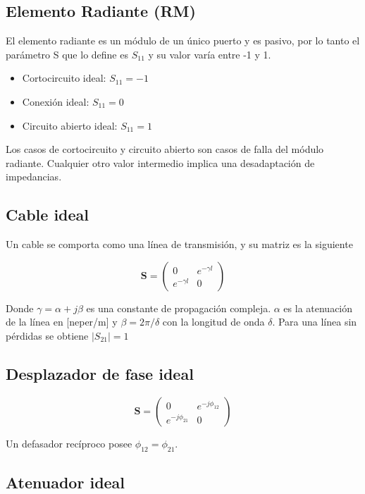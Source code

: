 \subsection{Elemento Radiante (RM)}

El elemento radiante es un módulo de un único puerto y es pasivo, por lo tanto el parámetro S que lo define es $S_{11}$ y su
valor varía entre -1 y 1.

\begin{itemize}
	\item Cortocircuito ideal: $S_{11} = -1$
	\item Conexión ideal: $S_{11} = 0$
	\item Circuito abierto ideal: $S_{11} = 1$
\end{itemize}

Los casos de cortocircuito y circuito abierto son casos de falla del módulo radiante. Cualquier otro valor intermedio implica
una desadaptación de impedancias.

\subsection{Cable ideal}
Un cable se comporta como una línea de transmisión, y su matriz es la siguiente

$$
\mathbf{S} = \begin{pmatrix} 0 & e^{-\gamma l}\\e^{-\gamma l} & 0\end{pmatrix}
$$

Donde $\gamma = \alpha + j\beta$ es una constante de propagación compleja. $\alpha$ es la atenuación de la línea en [neper/m]
y $\beta = 2\pi/\delta$ con la longitud de onda $\delta$. Para una línea sin pérdidas se obtiene $|S_{21}| = 1$

\subsection{Desplazador de fase ideal}


$$
\mathbf{S} = \begin{pmatrix} 0 & e^{-j\phi_{12}}\\e^{-j\phi_{21}} & 0\end{pmatrix}
$$

Un defasador recíproco posee $\phi_{12} = \phi_{21}$.

\subsection{Atenuador ideal}

